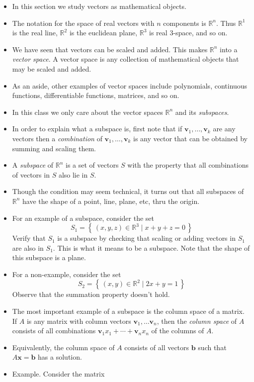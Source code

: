 \documentclass[11pt,oneside]{amsbook}
\newcommand{\set}[1]{\left\{\,#1\,\right\}}
\newcommand{\RR}{\mathbb R}
\theoremstyle{definition}
\theoremstyle{plain}
\theoremstyle{definition}
\theoremstyle{remark}
\numberwithin{equation}{section}
\numberwithin{figure}{section}
\begin{document}
\begin{itemize}
\item In this section we study vectors as mathematical objects.
\item The notation for the space of real vectors with $n$ components is $\RR^n$. Thus $\RR^1$ is the real line, $\RR^2$ is the euclidean plane, $\RR^3$ is real $3$-space, and so on.
\item We have seen that vectors can be scaled and added. This makes $\RR^n$ into a \emph{vector space}. A vector space is any collection of mathematical objects that may be scaled and added.
\item As an aside, other examples of vector spaces include polynomials, continuous functions, differentiable functions, matrices, and so on.
\item In this class we only care about the vector spaces $\RR^n$ and its \emph{subspaces}.
\item In order to explain what a subspace is, first note that if $\textbf{v}_1,\ldots,\textbf{v}_k$ are any vectors then a \emph{combination} of $\textbf{v}_1,\ldots,\textbf{v}_k$ is any vector that can be obtained by summing and scaling them.
\item A \emph{subspace} of $\RR^n$ is a set of vectors $S$ with the property that all combinations of vectors in $S$ also lie in $S$.
\item Though the condition may seem technical, it turns out that all subspaces of $\RR^n$ have the shape of a point, line, plane, etc, thru the origin.
\item For an example of a subspace, consider the set
  \[S_1=\set{(x,y,z)\in\RR^3\mid x+y+z=0}
  \]
  Verify that $S_1$ is a subspace by checking that scaling or adding vectors in $S_1$ are also in $S_1$. This is what it means to be a subspace. Note that the shape of this subspace is a plane.
\item For a non-example, consider the set
  \[S_2=\set{(x,y)\in\RR^2\mid 2x+y=1}
  \]
  Observe that the summation property doesn't hold.
\item The most important example of a subspace is the column space of a matrix. If $A$ is any matrix with column vectors $\mathbf{v}_1,\ldots\mathbf{v}_n$, then the \emph{column space} of $A$ consists of all combinations $\mathbf{v}_1x_1+\cdots+\mathbf{v}_nx_n$ of the columns of $A$.
\item Equivalently, the column space of $A$ consists of all vectors $\mathbf{b}$ such that $A\mathbf{x}=\mathbf{b}$ has a solution.
\item Example. Consider the matrix

\end{itemize}
\end{document}
